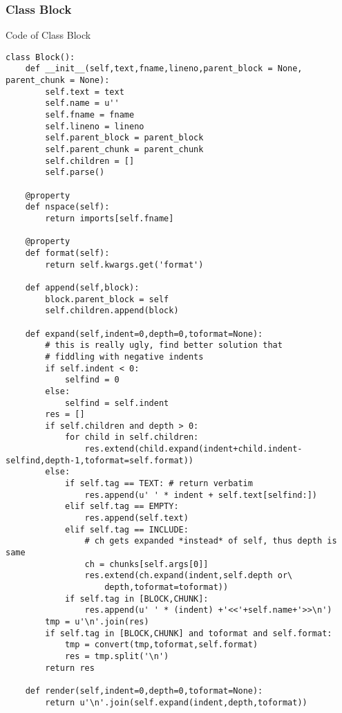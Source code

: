 \documentclass[neutral,proc,reqno]{ml-gen}
\begin{document}
\subsubsection{Class Block}

Code of Class Block

\begin{lstlisting}
class Block():
    def __init__(self,text,fname,lineno,parent_block = None, parent_chunk = None):
        self.text = text
        self.name = u''
        self.fname = fname
        self.lineno = lineno
        self.parent_block = parent_block
        self.parent_chunk = parent_chunk
        self.children = []
        self.parse()

    @property
    def nspace(self):
        return imports[self.fname]

    @property
    def format(self):
        return self.kwargs.get('format')

    def append(self,block):
        block.parent_block = self
        self.children.append(block)

    def expand(self,indent=0,depth=0,toformat=None):
        # this is really ugly, find better solution that
        # fiddling with negative indents
        if self.indent < 0:
            selfind = 0
        else:
            selfind = self.indent
        res = []
        if self.children and depth > 0:
            for child in self.children:
                res.extend(child.expand(indent+child.indent-selfind,depth-1,toformat=self.format))
        else:        
            if self.tag == TEXT: # return verbatim
                res.append(u' ' * indent + self.text[selfind:])
            elif self.tag == EMPTY:
                res.append(self.text)
            elif self.tag == INCLUDE: 
                # ch gets expanded *instead* of self, thus depth is same
                ch = chunks[self.args[0]]
                res.extend(ch.expand(indent,self.depth or\
                    depth,toformat=toformat))
            if self.tag in [BLOCK,CHUNK]:
                res.append(u' ' * (indent) +'<<'+self.name+'>>\n') 
        tmp = u'\n'.join(res)
        if self.tag in [BLOCK,CHUNK] and toformat and self.format:
            tmp = convert(tmp,toformat,self.format)
            res = tmp.split('\n')
        return res 

    def render(self,indent=0,depth=0,toformat=None):
        return u'\n'.join(self.expand(indent,depth,toformat))


\end{lstlisting}
\end{document}
